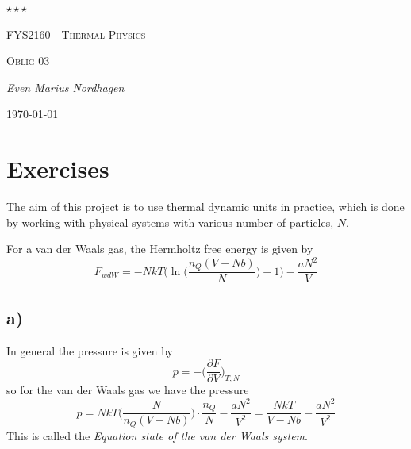 \documentclass{scrartcl}
\begin{document}
\begin{titlepage}
	\centering
	{\scshape\LARGE $\star\star\star$  \par}
	\vspace{4cm}
	{\scshape\huge FYS2160 - Thermal Physics  \par}
	\vspace{1cm}
	{\scshape\Large Oblig 03\par}
	\vspace{2cm}
	{\Large\itshape Even Marius Nordhagen\par}
	\vfill
	{\large \today\par}
\end{titlepage}

\section*{Exercises}
The aim of this project is to use thermal dynamic units in practice, which is done by working with physical systems with various number of particles, $N$. 

For a van der Waals gas, the Hermholtz free energy is given by
\begin{equation}
F_{wdW}=-NkT\Bigg(\ln\bigg(\frac{n_Q(V-Nb)}{N}\bigg)+1\Bigg)-\frac{aN^2}{V}
\end{equation}

\subsection*{a)}
In general the pressure is given by
\begin{equation}
p=-\bigg(\frac{\partial F}{\partial V}\bigg)_{T,N}
\end{equation}
so for the van der Waals gas we have the pressure
\begin{equation}
p=NkT\bigg(\frac{N}{n_Q(V-Nb)}\bigg)\cdot \frac{n_Q}{N}-\frac{aN^2}{V^2}=\frac{NkT}{V-Nb}-\frac{aN^2}{V^2}
\label{eq:pressure}
\end{equation}
This is called the \textit{Equation state of the van der Waals system}.
\end{document}

